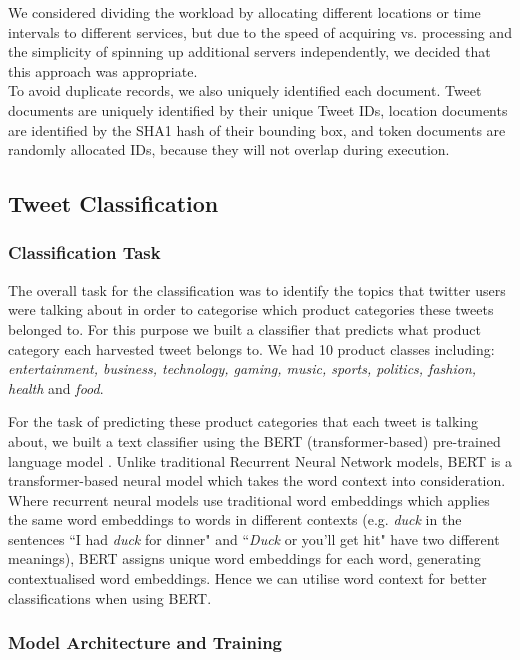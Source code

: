 \documentclass[parskip=full, 11pt]{article}
\begin{document}
We considered dividing the workload by allocating different locations or time intervals to different services, but due to the speed of acquiring vs. processing and the simplicity of spinning up additional servers independently, we decided that this approach was appropriate. \\

To avoid duplicate records, we also uniquely identified each document. Tweet documents are uniquely identified by their unique Tweet IDs, location documents are identified by the SHA1 hash of their bounding box, and token documents are randomly allocated IDs, because they will not overlap during execution.

\subsection{Tweet Classification}
\label{subsec:classification}

\subsubsection{Classification Task} 
The overall task for the classification was to identify the topics that twitter users were talking about in order to categorise which product categories these tweets belonged to. For this purpose we built a classifier that predicts what product category each harvested tweet belongs to. We had 10 product classes including: \emph{entertainment, business, technology, gaming, music, sports, politics, fashion, health} and \emph{food}. 


For the task of predicting these product categories that each tweet is talking about, we built a text classifier using the BERT (transformer-based) pre-trained language model \citep{devlin-etal-2019-bert}. Unlike traditional Recurrent Neural Network models, BERT is a transformer-based neural model which takes the word context into consideration. Where recurrent neural models use traditional word embeddings which applies the same word embeddings to words in different contexts (e.g. \emph{duck} in the sentences ``I had \emph{duck} for dinner" and ``\emph{Duck} or you'll get hit" have two different meanings), BERT assigns unique word embeddings for each word, generating contextualised word embeddings. Hence we can utilise word context for better classifications when using BERT. 

\subsubsection{Model Architecture and Training}
\end{document}
